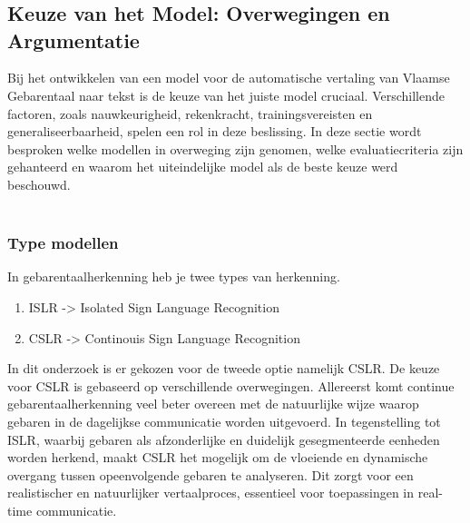 \chapter{}%
\label{ch:stand-van-zaken}



\section{Keuze van het Model: Overwegingen en Argumentatie}
Bij het ontwikkelen van een model voor de automatische vertaling van Vlaamse Gebarentaal naar tekst is de keuze van het juiste model cruciaal. 
Verschillende factoren, zoals nauwkeurigheid, rekenkracht, trainingsvereisten en generaliseerbaarheid, spelen een rol in deze beslissing. 
In deze sectie wordt besproken welke modellen in overweging zijn genomen, welke evaluatiecriteria zijn gehanteerd en waarom het uiteindelijke model als de beste keuze werd beschouwd.
\\
\\
\subsection{Type modellen}
In gebarentaalherkenning heb je twee types van herkenning.\autocite{Ahn_Jang_Chung_Korea_Advanced_Institute_of_Science_and_Technology_2023}
\begin{enumerate}
  \item ISLR -> Isolated Sign Language Recognition
  \item CSLR -> Continouis Sign Language Recognition
\end{enumerate}
In dit onderzoek is er gekozen voor de tweede optie namelijk CSLR.
De keuze voor CSLR is gebaseerd op verschillende overwegingen. 
Allereerst komt continue gebarentaalherkenning veel beter overeen met de natuurlijke wijze waarop gebaren in de dagelijkse communicatie worden uitgevoerd. 
In tegenstelling tot ISLR, waarbij gebaren als afzonderlijke en duidelijk gesegmenteerde eenheden worden herkend, maakt CSLR het mogelijk om de vloeiende en dynamische overgang tussen opeenvolgende gebaren te analyseren. 
Dit zorgt voor een realistischer en natuurlijker vertaalproces, essentieel voor toepassingen in real-time communicatie.
\\
\\

